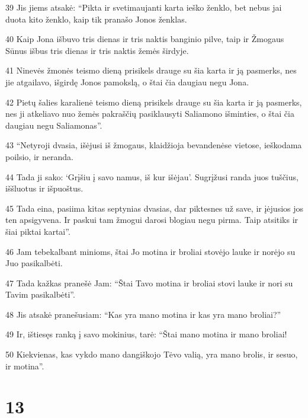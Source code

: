 \par 39 Jis jiems atsakė: “Pikta ir svetimaujanti karta ieško ženklo, bet nebus jai duota kito ženklo, kaip tik pranašo Jonos ženklas. 
\par 40 Kaip Jona išbuvo tris dienas ir tris naktis banginio pilve, taip ir Žmogaus Sūnus išbus tris dienas ir tris naktis žemės širdyje. 
\par 41 Ninevės žmonės teismo dieną prisikels drauge su šia karta ir ją pasmerks, nes jie atgailavo, išgirdę Jonos pamokslą, o štai čia daugiau negu Jona. 
\par 42 Pietų šalies karalienė teismo dieną prisikels drauge su šia karta ir ją pasmerks, nes ji atkeliavo nuo žemės pakraščių pasiklausyti Saliamono išminties, o štai čia daugiau negu Saliamonas”. 
\par 43 “Netyroji dvasia, išėjusi iš žmogaus, klaidžioja bevandenėse vietose, ieškodama poilsio, ir neranda. 
\par 44 Tada ji sako: ‘Grįšiu į savo namus, iš kur išėjau’. Sugrįžusi randa juos tuščius, iššluotus ir išpuoštus. 
\par 45 Tada eina, pasiima kitas septynias dvasias, dar piktesnes už save, ir įėjusios jos ten apsigyvena. Ir paskui tam žmogui darosi blogiau negu pirma. Taip atsitiks ir šiai piktai kartai”. 
\par 46 Jam tebekalbant minioms, štai Jo motina ir broliai stovėjo lauke ir norėjo su Juo pasikalbėti. 
\par 47 Tada kažkas pranešė Jam: “Štai Tavo motina ir broliai stovi lauke ir nori su Tavim pasikalbėti”. 
\par 48 Jis atsakė pranešusiam: “Kas yra mano motina ir kas yra mano broliai?” 
\par 49 Ir, ištiesęs ranką į savo mokinius, tarė: “Štai mano motina ir mano broliai! 
\par 50 Kiekvienas, kas vykdo mano dangiškojo Tėvo valią, yra mano brolis, ir sesuo, ir motina”.



\chapter{13}


